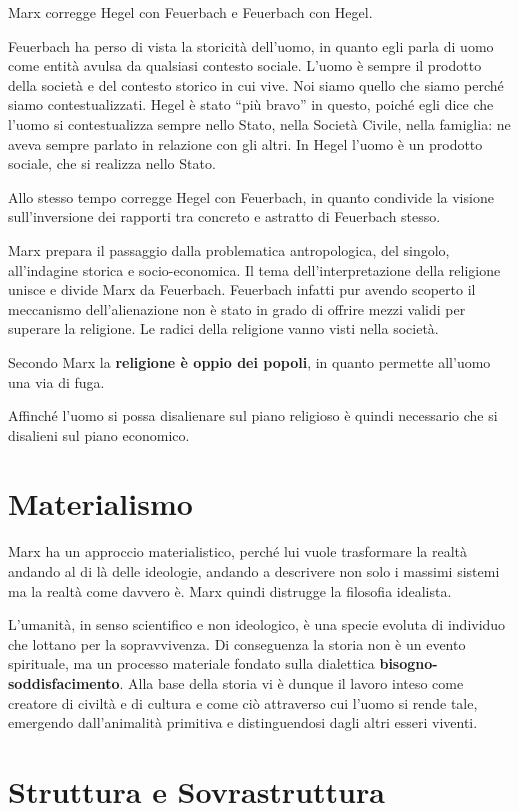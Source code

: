\documentclass[a4paper, twoside, titlepage]{book}
\begin{document}
Marx corregge Hegel con Feuerbach e Feuerbach con Hegel.

Feuerbach ha perso di vista la storicità dell’uomo, in quanto egli parla di uomo come entità avulsa da qualsiasi contesto sociale.
L’uomo è sempre il prodotto della società e del contesto storico in cui vive. Noi siamo quello che siamo perché siamo contestualizzati.
Hegel è stato “più bravo” in questo, poiché egli dice che l’uomo si contestualizza sempre nello Stato, nella Società Civile, nella famiglia: ne aveva sempre parlato in relazione con gli altri. In Hegel l’uomo è un prodotto sociale, che si realizza nello Stato.

Allo stesso tempo corregge Hegel con Feuerbach, in quanto condivide la visione sull’inversione dei rapporti tra concreto e astratto di Feuerbach stesso.

Marx prepara il passaggio dalla problematica antropologica, del singolo, all’indagine storica e socio-economica.
Il tema dell’interpretazione della religione unisce e divide Marx da Feuerbach.
Feuerbach infatti pur avendo scoperto il meccanismo dell’alienazione non è stato in grado di offrire mezzi validi per superare la religione.
Le radici della religione vanno visti nella società.

Secondo Marx la \textbf{religione è oppio dei popoli}, in quanto permette all’uomo una via di fuga.

Affinché l’uomo si possa disalienare sul piano religioso è quindi necessario che si disalieni sul piano economico.

\chapter{Materialismo}

Marx ha un approccio materialistico, perché lui vuole trasformare la realtà andando al di là delle ideologie, andando a descrivere non solo i massimi sistemi ma la realtà come davvero è.
Marx quindi distrugge la filosofia idealista.

L’umanità, in senso scientifico e non ideologico, è una specie evoluta di individuo che lottano per la sopravvivenza.
Di conseguenza la storia non è un evento spirituale, ma un processo materiale fondato sulla dialettica \textbf{bisogno-soddisfacimento}.
Alla base della storia vi è dunque il lavoro inteso come creatore di civiltà e di cultura e come ciò attraverso cui l’uomo si rende tale, emergendo dall’animalità primitiva e distinguendosi dagli altri esseri viventi.

\chapter{Struttura e Sovrastruttura}
\end{document}
